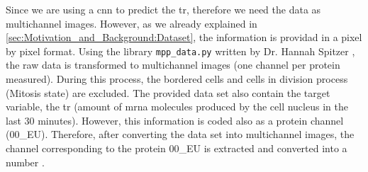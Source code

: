 Since we are using a \gls{cnn} to predict the \gls{tr}, therefore we need the data as multichannel images. However, as we already explained in \ref{sec:Motivation_and_Background:Dataset}, the information is providad in a pixel by pixel format. Using the library \texttt{mpp\_data.py} written by Dr. Hannah Spitzer , the raw data is transformed to multichannel images (one channel per protein measured). During this process, the bordered cells and cells in division process (Mitosis state) are excluded. The provided data set also contain the target variable, \ie the \gls{tr} (amount of \gls{mrna} molecules produced by the cell nucleus in the last 30 minutes). However, this information is coded also as a protein channel (00\_EU). Therefore, after converting the data set into multichannel images, the channel corresponding to the protein 00\_EU is extracted and converted into a number .
